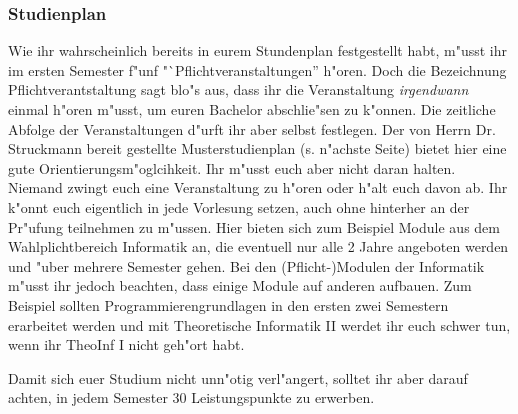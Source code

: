 \subsubsection{Studienplan}

Wie ihr wahrscheinlich bereits in eurem Stundenplan festgestellt habt, m"usst ihr im ersten Semester f"unf "`Pflichtveranstaltungen'' h"oren.
Doch die Bezeichnung Pflichtverantstaltung sagt blo"s aus, dass ihr die Veranstaltung \emph{irgendwann} einmal h"oren m"usst, um euren Bachelor abschlie"sen zu k"onnen.
Die zeitliche Abfolge der Veranstaltungen d"urft ihr aber selbst festlegen.
Der von Herrn Dr. Struckmann bereit gestellte Musterstudienplan (s. n"achste Seite) bietet hier eine gute Orientierungsm"oglcihkeit.
Ihr m"usst euch aber nicht daran halten. Niemand zwingt euch eine Veranstaltung zu h"oren oder h"alt euch davon ab.
Ihr k"onnt euch eigentlich in jede Vorlesung setzen, auch ohne hinterher an der Pr"ufung teilnehmen zu m"ussen.
Hier bieten sich zum Beispiel Module aus dem Wahlplichtbereich Informatik an, die eventuell nur alle 2 Jahre angeboten werden und "uber mehrere Semester gehen.
Bei den (Pflicht-)Modulen der Informatik m"usst ihr jedoch beachten, dass einige Module auf anderen aufbauen.
Zum Beispiel sollten Programmierengrundlagen in den ersten zwei Semestern erarbeitet werden und mit Theoretische Informatik II werdet ihr euch schwer tun, wenn ihr TheoInf I nicht geh"ort habt.

Damit sich euer Studium nicht unn"otig verl"angert, solltet ihr aber darauf achten, in jedem Semester 30 Leistungspunkte zu erwerben. 

